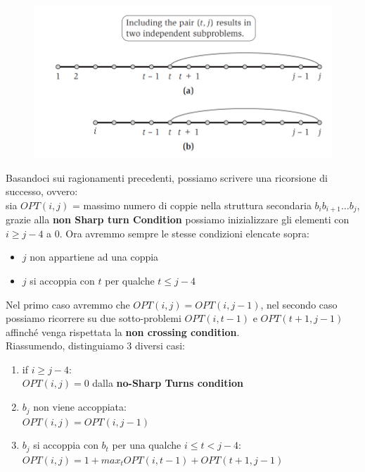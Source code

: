 \begin{figure}[H]
  \centering
  \includegraphics[width=15cm, keepaspectratio]{capitoli/programmazione_dinamica/imgs/rna3.png}
  \centering
\end{figure}


Basandoci sui ragionamenti precedenti, possiamo scrivere
una ricorsione di successo, ovvero:\\

sia $OPT(i,j)$ = massimo numero di coppie nella
struttura secondaria $b_i b_{i+1} \ldots b_j$, grazie alla \textbf{non
  Sharp turn Condition} possiamo inizializzare gli elementi con
$i \geq j -4$ a $0$. Ora avremmo sempre le stesse condizioni
elencate sopra:
\begin{itemize}
  \item $j$ non appartiene ad una coppia
  \item $j$ si accoppia
        con $t$ per qualche $t \leq j - 4$
\end{itemize}

Nel primo caso avremmo che $OPT(i,j) = OPT(i, j-1)$, nel secondo caso
possiamo ricorrere su due sotto-problemi $OPT(i, t-1)$ e
$OPT(t+1, j-1)$ affinché venga rispettata la \textbf{non crossing
  condition}.\\

Riassumendo, distinguiamo 3 diversi casi:
\begin{enumerate}
  \item if $i \ge j -4$:\\
        $OPT(i,j) = 0$ dalla \textbf{no-Sharp Turns condition}
  \item $b_j$ non viene accoppiata:\\ $OPT(i,j) = OPT(i,j-1)$
  \item $b_j$ si accoppia con $b_t$ per una qualche $i \le t < j -4$:\\
        $OPT(i,j) = 1 + max_t{OPT(i, t-1) + OPT(t+1, j-1)}$
\end{enumerate}


